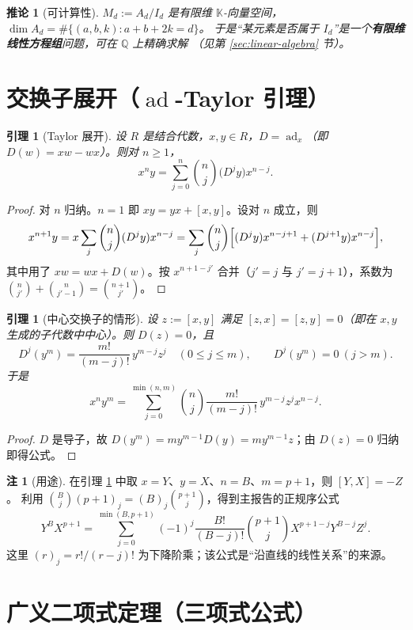 \documentclass[11pt,UTF8]{ctexart}
\newtheorem{lemma}[theorem]{引理}
\newtheorem{corollary}[theorem]{推论}
\theoremstyle{definition}
\newtheorem{remark}[theorem]{注}
\newcommand{\ad}{\operatorname{ad}}
\newcommand{\Q}{\mathbb{Q}}
\newcommand{\K}{\mathbb{K}}
\begin{document}
\begin{corollary}[可计算性]
$M_d:=A_d/I_d$ 是有限维 $\K$-向量空间，$\dim A_d=\#\{(a,b,k): a+b+2k=d\}$。
于是“某元素是否属于 $I_d$”是一个\textbf{有限维线性方程组}问题，可在 $\Q$ 上精确求解
（见第 \ref{sec:linear-algebra} 节）。
\end{corollary}

\section{交换子展开（$\ad$-Taylor 引理）}\label{sec:adtaylor}

\begin{lemma}[Taylor 展开]\label{lem:taylor}
设 $R$ 是结合代数，$x,y\in R$，$D=\ad_x$（即 $D(w)=xw-wx$）。则对 $n\ge1$，
\[
x^{n}y=\sum_{j=0}^{n}\binom{n}{j}\bigl(D^{j}y\bigr)x^{n-j}.
\]
\end{lemma}

\begin{proof}
对 $n$ 归纳。$n=1$ 即 $xy=yx+[x,y]$。设对 $n$ 成立，则
\[
x^{n+1}y=x\sum_{j}\binom{n}{j}(D^{j}y)x^{n-j}
=\sum_{j}\binom{n}{j}\Bigl[(D^{j}y)x^{n-j+1}+(D^{j+1}y)x^{n-j}\Bigr],
\]
其中用了 $xw=wx+D(w)$。按 $x^{n+1-j'}$ 合并（$j'=j$ 与 $j'=j+1$），系数为
$\binom{n}{j'}+\binom{n}{j'-1}=\binom{n+1}{j'}$。
\end{proof}

\begin{lemma}[中心交换子的情形]\label{lem:central}
设 $z:=[x,y]$ 满足 $[z,x]=[z,y]=0$（即在 $x,y$ 生成的子代数中中心）。则 $D(z)=0$，且
\[
D^{j}(y^{m})=\frac{m!}{(m-j)!}\,y^{m-j}z^{j}\quad(0\le j\le m),\qquad D^{j}(y^m)=0\ (j>m).
\]
于是
\[
x^{n}y^{m}=\sum_{j=0}^{\min(n,m)}\binom{n}{j}\frac{m!}{(m-j)!}\,y^{m-j}z^{j}x^{n-j}.
\]
\end{lemma}

\begin{proof}
$D$ 是导子，故 $D(y^m)=m y^{m-1}D(y)=my^{m-1}z$；由 $D(z)=0$ 归纳即得公式。
\end{proof}

\begin{remark}[用途]\label{rem:normal}
在引理 \ref{lem:central} 中取 $x=Y$、$y=X$、$n=B$、$m=p+1$，则 $[Y,X]=-Z$。
利用 $\binom{B}{j}(p+1)_j=(B)_j\binom{p+1}{j}$，得到主报告的正规序公式
\[
Y^BX^{p+1}=\sum_{j=0}^{\min(B,p+1)}(-1)^j\frac{B!}{(B-j)!}\binom{p+1}{j}X^{p+1-j}Y^{B-j}Z^j.
\]
这里 $(r)_j=r!/(r-j)!$ 为下降阶乘；该公式是“沿直线的线性关系”的来源。
\end{remark}

\section{广义二项式定理（三项式公式）}\label{sec:trinomial}
\end{document}
